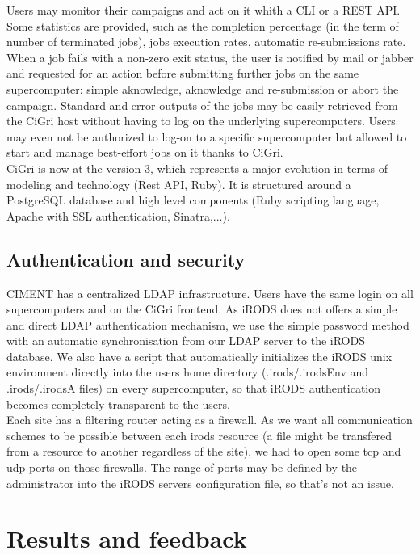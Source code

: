 \documentclass[a4paper, 10pt]{article}
\begin{document}
\begin{multicols}{2}

Users may monitor their campaigns and act on it whith a CLI or a REST API. Some statistics are provided, such as the completion percentage (in the term of number of terminated jobs), jobs execution rates, automatic re-submissions rate. When a job fails with a non-zero exit status, the user is notified by mail or jabber and requested for an action before submitting further jobs on the same supercomputer: simple aknowledge, aknowledge and re-submission or abort the campaign. Standard and error outputs of the jobs may be easily retrieved from the CiGri host without having to log on the underlying supercomputers. Users may even not be authorized to log-on to a specific supercomputer but allowed to start and manage best-effort jobs on it thanks to CiGri.
\\
CiGri is now at the version 3, which represents a major evolution in terms of modeling and technology (Rest API, Ruby). It is structured around a PostgreSQL database and high level components (Ruby scripting language, Apache with SSL authentication, Sinatra,...).


\subsection{Authentication and security}

CIMENT has a centralized LDAP infrastructure. Users have the same login on all supercomputers and on the CiGri frontend. As iRODS does not offers a simple and direct LDAP authentication mechanism, we use the simple password method with an automatic synchronisation from our LDAP server to the iRODS database. We also have a script that automatically initializes the iRODS unix environment directly into the users home directory (.irods/.irodsEnv and .irods/.irodsA files) on every supercomputer, so that iRODS authentication becomes completely transparent to the users.
\\
Each site has a filtering router acting as a firewall. As we want all communication schemes to be possible between each irods resource (a file might be transfered from a resource to another regardless of the site), we had to open some tcp and udp ports on those firewalls. The range of ports may be defined by the administrator into the iRODS servers configuration file, so that's not an issue.



\section{Results and feedback} %


\end{multicols}
\end{document}

